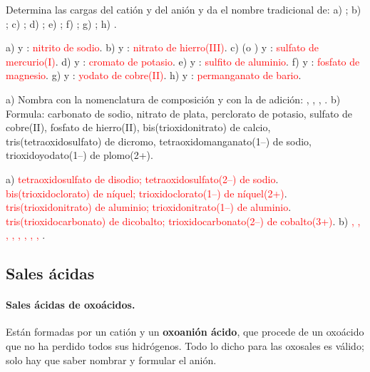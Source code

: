 \begin{exercise}
    Determina las cargas del catión y del anión y da el nombre tradicional de: a) ; b) ; c) ;
    d) ; e) ; f) ; g) ; h) .
    \begin{solu}
        a)  y : \textcolor{red}{nitrito de sodio}. b)  y : \textcolor{red}{nitrato de
        hierro(III)}. c)  (o ) y : \textcolor{red}{sulfato de mercurio(I)}. d)  y :
        \textcolor{red}{cromato de potasio}. e)  y : \textcolor{red}{sulfito de aluminio}. f)  y
        : \textcolor{red}{fosfato de magnesio}. g)  y : \textcolor{red}{yodato de cobre(II)}.
        h)  y : \textcolor{red}{permanganato de bario}.
    \end{solu}
\end{exercise}

\begin{exercise}
    a) Nombra con la nomenclatura de composición y con la de adición: , , ,
    . b) Formula: carbonato de sodio, nitrato de plata, perclorato de potasio, sulfato de cobre(II), fosfato de
    hierro(II), bis(trioxidonitrato) de calcio, tris(tetraoxidosulfato) de dicromo, tetraoxidomanganato(1\nobreakdash--) de sodio,
    trioxidoyodato(1\nobreakdash--) de plomo(2+).
    \begin{solu}
        a) \textcolor{red}{tetraoxidosulfato de disodio; tetraoxidosulfato(2\nobreakdash--) de sodio}. \textcolor{red}{bis(trioxidoclorato) de
        níquel; trioxidoclorato(1\nobreakdash--) de níquel(2+)}. \textcolor{red}{tris(trioxidonitrato) de aluminio; trioxidonitrato(1\nobreakdash--) de
        aluminio}. \textcolor{red}{tris(trioxidocarbonato) de dicobalto; trioxidocarbonato(2\nobreakdash--) de cobalto(3+)}.
        b) \textcolor{red}{, , , , , , ,
        , }.
    \end{solu}
\end{exercise}

\subsection{Sales ácidas}\label{sec:ud5-sales-acidas}

\paragraph{Sales ácidas de oxoácidos.} Están formadas por un catión y un \textbf{oxoanión ácido}, que procede de un oxoácido que
no ha perdido todos sus hidrógenos. Todo lo dicho para las oxosales es válido; solo hay que saber nombrar y formular el anión.

